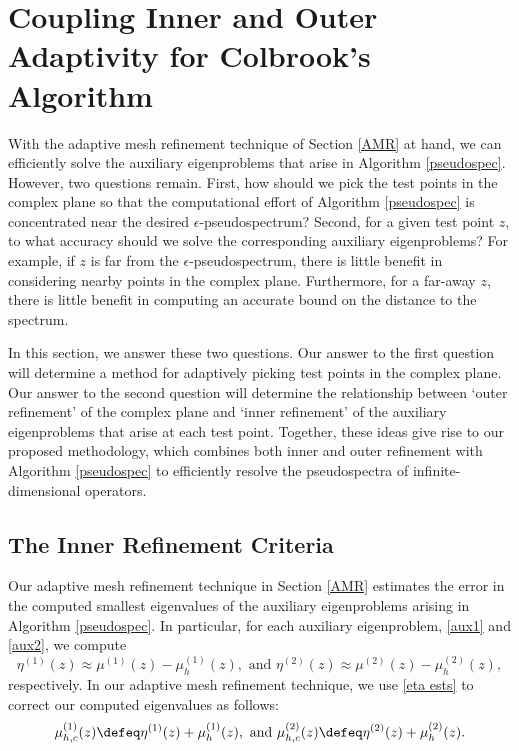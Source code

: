 


\section{Coupling Inner and Outer Adaptivity for Colbrook's Algorithm}

With the adaptive mesh refinement technique of Section \ref{AMR} at hand, we can efficiently solve the auxiliary eigenproblems that arise in Algorithm \ref{pseudospec}. However, two questions remain. First, how should we pick the test points in the complex plane so that the computational effort of Algorithm \ref{pseudospec} is concentrated near the desired $\epsilon$-pseudospectrum? Second, for a given test point $z,$ to what accuracy should we solve the corresponding auxiliary eigenproblems? For example, if $z$ is far from the $\epsilon$-pseudospectrum, there is little benefit in considering nearby points in the complex plane. Furthermore, for a far-away $z,$ there is little benefit in computing an accurate bound on the distance to the spectrum.


In this section, we answer these two questions. Our answer to the first question will determine a method for adaptively picking test points in the complex plane. Our answer to the second question will determine the relationship between `outer refinement' of the complex plane and `inner refinement' of the auxiliary eigenproblems that arise at each test point. Together, these ideas give rise to our proposed methodology, which combines both inner and outer refinement with Algorithm \ref{pseudospec} to efficiently resolve the pseudospectra of infinite-dimensional operators. 


\subsection{The Inner Refinement Criteria}

Our adaptive mesh refinement technique in Section \ref{AMR} estimates the error in the computed smallest eigenvalues of the auxiliary eigenproblems arising in Algorithm \ref{pseudospec}. In particular, for each auxiliary eigenproblem, \eqref{aux1} and \eqref{aux2}, we compute 
\begin{equation} \label{eta ests}
    \eta^{(1)}(z) \approx  \mu^{(1)}(z) - \mu_h^{(1)}(z), \text{ and } \eta^{(2)}(z) \approx  \mu^{(2)}(z) - \mu_h^{(2)}(z),
\end{equation}
respectively. In our adaptive mesh refinement technique, we use \eqref{eta ests} to correct our computed eigenvalues as follows:
\begin{equation} \label{corrected}
    \mu_{h,c} ^{(1)}(z) \defeq  \eta^{(1)}(z) + \mu_h^{(1)}(z), \text{ and } \mu_{h,c} ^{(2)}(z) \defeq  \eta^{(2)}(z) + \mu_h^{(2)}(z).
\end{equation}

